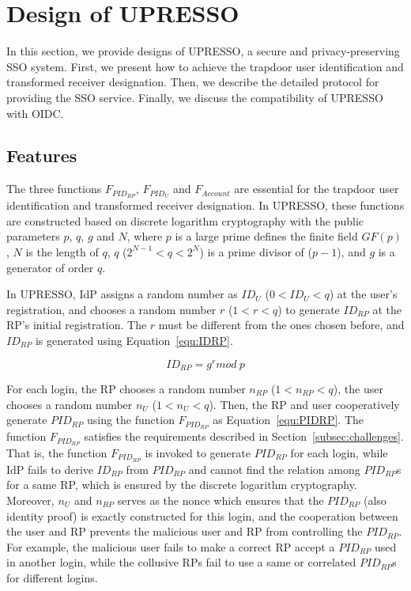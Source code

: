 \section{Design of UPRESSO}
\label{sec:UPRESSO}
In this section, we provide designs of UPRESSO, a secure and privacy-preserving SSO system.
First, we present how to achieve the trapdoor user identification and transformed receiver designation. Then, we describe the detailed protocol for providing the SSO service. Finally, we discuss the compatibility of UPRESSO with OIDC.

\subsection{Features}
\label{subsec:overview}
The three functions $F_{PID_{RP}}$, $F_{PID_U}$ and $F_{Account}$  are essential for the trapdoor user identification and  transformed receiver designation.
In UPRESSO, these functions are constructed based on discrete logarithm cryptography with the public parameters $p$, $q$, $g$ and $N$,
 where  $p$ is a large prime defines the finite field $GF(p)$, $N$ is the length of $q$, $q$ ($2^{N-1} < q < 2^N$) is a prime divisor of ($p-1$), and $g$ is a generator of order $q$.

In UPRESSO, IdP assigns a  random number as  $ID_U$ ($0 < ID_U <q $)  at the user's registration, and chooses a random number $r$ ($1 < r < q$) to generate $ID_{RP}$ at the RP’s initial registration. The $r$ must be different from the ones chosen before, and $ID_{RP}$ is generated using Equation~\ref{equ:IDRP}.
 
\begin{equation}
    ID_{RP} = g^{r} mod \ p
   \label{equ:IDRP}
\end{equation}


For each login, the RP chooses a random number $n_{RP}$ ($1 < n_{RP}<q $), the user chooses a random number $n_{U}$ ($1 < n_{U}<q $). Then, the RP and user cooperatively  generate $PID_{RP}$ using the function $F_{PID_{RP}}$ as Equation~\ref{equ:PIDRP}. The function $F_{PID_{RP}}$ satisfies the requirements described in Section~\ref{subsec:challenges}. That is, the function $F_{PID_{RP}}$ is invoked to generate $PID_{RP}$ for each login, while IdP  fails to derive $ID_{RP}$ from $PID_{RP}$ and cannot find the relation among ${PID_{RP}}$s for a same RP, which is ensured by the discrete logarithm cryptography.
Moreover, $n_{U}$ and $n_{RP}$  serves as the nonce which ensures that the $PID_{RP}$ (also identity proof) is exactly constructed for this login, and
the cooperation between the user and RP prevents the malicious user and RP from controlling the  $PID_{RP}$. For example, the malicious user fails to make a correct RP accept a $PID_{RP}$ used in another login, while the collusive RPs fail to use a same or correlated $PID_{RP}$s for different logins.



